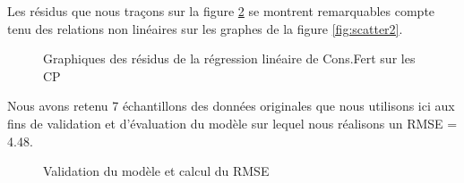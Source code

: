 	Les résidus que nous traçons sur la figure \ref{fig:residuals} se montrent remarquables compte tenu des relations non linéaires sur les graphes de la figure \ref{fig:scatter2}.
						\begin{figure}[H]
							    		\centering
							    		\caption{Graphiques des résidus de la régression linéaire de Cons.Fert sur les CP}
							    		\label{fig:residuals}
						\end{figure}
	Nous avons retenu 7 échantillons des données originales que nous utilisons ici aux fins de validation et d'évaluation du modèle sur lequel nous réalisons un RMSE = 4.48.
							\begin{figure}[H]
								    		\centering
								    		\caption{Validation du modèle et calcul du RMSE}
								    		\label{fig:residuals}
							\end{figure}
	